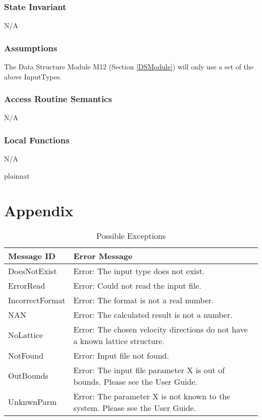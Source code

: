 \documentclass[12pt, titlepage]{article}
\begin{document}
\subsubsection{State Invariant}
N/A

\subsubsection{Assumptions}

The Data Structure Module M12 (Section \ref{DSModule}) will only use a set of the above InputTypes.

\subsubsection{Access Routine Semantics}
N/A

\subsubsection{Local Functions}
N/A

\newpage

 {plainnat}


\newpage

\section{Appendix} \label{Appendix}

\begin{longtable}{l p{12cm}}
	\caption{Possible Exceptions} \\
	\toprule
	\textbf{Message ID} & \textbf{Error Message} \\
	\midrule
	DoesNotExist & Error: The input type does not exist.\\ 
	ErrorRead & Error: Could not read the input file. \\
	IncorrectFormat & Error: The format is not a real number.\\
	NAN & Error: The calculated result is not a number.\\
	NoLattice & Error: The chosen velocity directions do not have a known lattice structure.\\
	NotFound & Error: Input file not found. \\
	OutBounds & Error: The input file parameter X is out of bounds. Please see the User Guide.\\
	UnknwnParm & Error: The parameter X is not known to the system. Please see the User Guide.\\	
	\bottomrule
\end{longtable}
\end{document}
